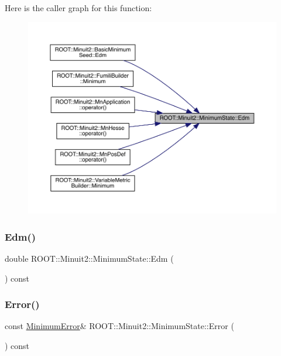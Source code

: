 Here is the caller graph for this function\+:\nopagebreak
\begin{figure}[H]
\begin{center}
\leavevmode
\includegraphics[width=350pt]{db/dcd/classROOT_1_1Minuit2_1_1MinimumState_a397315b170efca9446f7d6a91bae6c59_icgraph}
\end{center}
\end{figure}
\mbox{\label{classROOT_1_1Minuit2_1_1MinimumState_a397315b170efca9446f7d6a91bae6c59}} 
\subsubsection{\texorpdfstring{Edm()}{Edm()}\hspace{0.1cm}{\footnotesize\ttfamily [2/2]}}
{\footnotesize\ttfamily double R\+O\+O\+T\+::\+Minuit2\+::\+Minimum\+State\+::\+Edm (\begin{DoxyParamCaption}{ }\end{DoxyParamCaption}) const\hspace{0.3cm}{\ttfamily [inline]}}

\mbox{\label{classROOT_1_1Minuit2_1_1MinimumState_a28d9bb6148e54a7bf4ca15ca9548fe23}} 
\subsubsection{\texorpdfstring{Error()}{Error()}\hspace{0.1cm}{\footnotesize\ttfamily [1/2]}}
{\footnotesize\ttfamily const \mbox{\hyperlink{classROOT_1_1Minuit2_1_1MinimumError}{Minimum\+Error}}\& R\+O\+O\+T\+::\+Minuit2\+::\+Minimum\+State\+::\+Error (\begin{DoxyParamCaption}{ }\end{DoxyParamCaption}) const\hspace{0.3cm}{\ttfamily [inline]}}

